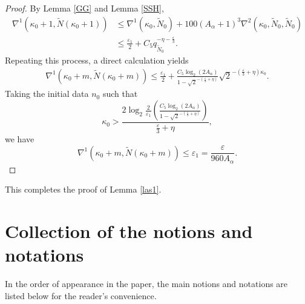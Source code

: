 \documentclass{amsart}
\theoremstyle{definition}
\begin{document}
\begin{proof}
{By Lemma \ref{GG} and Lemma \ref{SSH},
	\begin{align*}
		\nabla^1(\kappa_0+1,\tilde{N}(\kappa_0+1))&\leq \nabla^1(\kappa_0,\tilde{N}_0)+100(A_{\alpha}+1)^3\nabla^2(\kappa_0,\tilde{N}_0,\tilde{N}_0)\\
		&\leq \frac{\varepsilon_1}{2}+C_5q_{\tilde{N}_0}^{-\eta-\frac{\varepsilon}{3}}.
	\end{align*}
	Repeating this process, a direct calculation yields
	\begin{equation*}
		\begin{split}
			\nabla^1(\kappa_0+m,\tilde{N}(\kappa_0+m))\leq\frac{\varepsilon_1}{2}+\frac{C_5\log_{2}(2A_\alpha)}{1-\sqrt{2}^{-(\frac{\varepsilon}{3}+\eta)}}\sqrt{2}^{-(\frac{\varepsilon}{3}+\eta)\kappa_0}.
		\end{split}
	\end{equation*}
	Taking the initial data $n_0$ such that
	\begin{equation}\label{W1}
	\kappa_0 > \frac{2\log_{2}\frac{2}{\varepsilon_1}\left(\frac{C_5\log_{2}(2A_\alpha)}{1-\sqrt{2}^{-(\frac{\varepsilon}{3}+\eta)}}\right)}{\frac{\varepsilon}{3}+\eta},
	\end{equation}
	we have
	\[\nabla^1(\kappa_0+m,\tilde{N}(\kappa_0+m))\leq \varepsilon_1=\frac{\varepsilon}{960A_\alpha}.\]
}  \end{proof}
This completes the proof of Lemma \ref{las1}.
\medskip


\appendix
\section{Collection of the notions and notations}
In the order of appearance in the paper, the main notions and notations are listed below for the reader's convenience.
\end{document}

